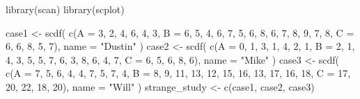 \documentclass[
  letterpaper,
  DIV=11,
  numbers=noendperiod]{scrreprt}
\newenvironment{Shaded}{\begin{snugshade}}{\end{snugshade}}
\newcommand{\AttributeTok}[1]{\textcolor[rgb]{0.40,0.45,0.13}{#1}}
\newcommand{\DecValTok}[1]{\textcolor[rgb]{0.68,0.00,0.00}{#1}}
\newcommand{\FunctionTok}[1]{\textcolor[rgb]{0.28,0.35,0.67}{#1}}
\newcommand{\NormalTok}[1]{\textcolor[rgb]{0.00,0.23,0.31}{#1}}
\newcommand{\OtherTok}[1]{\textcolor[rgb]{0.00,0.23,0.31}{#1}}
\newcommand{\StringTok}[1]{\textcolor[rgb]{0.13,0.47,0.30}{#1}}
\begin{document}
\begin{Shaded}
\begin{Highlighting}[]
\FunctionTok{library}\NormalTok{(scan)}
\FunctionTok{library}\NormalTok{(scplot)}

\NormalTok{case1 }\OtherTok{\textless{}{-}} \FunctionTok{scdf}\NormalTok{(}
  \FunctionTok{c}\NormalTok{(}\AttributeTok{A =} \DecValTok{3}\NormalTok{, }\DecValTok{2}\NormalTok{, }\DecValTok{4}\NormalTok{, }\DecValTok{6}\NormalTok{, }\DecValTok{4}\NormalTok{, }\DecValTok{3}\NormalTok{, }
    \AttributeTok{B =} \DecValTok{6}\NormalTok{, }\DecValTok{5}\NormalTok{, }\DecValTok{4}\NormalTok{, }\DecValTok{6}\NormalTok{, }\DecValTok{7}\NormalTok{, }\DecValTok{5}\NormalTok{, }\DecValTok{6}\NormalTok{, }\DecValTok{8}\NormalTok{, }\DecValTok{6}\NormalTok{, }\DecValTok{7}\NormalTok{, }\DecValTok{8}\NormalTok{, }\DecValTok{9}\NormalTok{, }\DecValTok{7}\NormalTok{, }\DecValTok{8}\NormalTok{, }
    \AttributeTok{C =} \DecValTok{6}\NormalTok{, }\DecValTok{6}\NormalTok{, }\DecValTok{8}\NormalTok{, }\DecValTok{5}\NormalTok{, }\DecValTok{7}\NormalTok{), }
  \AttributeTok{name =} \StringTok{"Dustin"}
\NormalTok{)}
\NormalTok{case2 }\OtherTok{\textless{}{-}} \FunctionTok{scdf}\NormalTok{(}
  \FunctionTok{c}\NormalTok{(}\AttributeTok{A =} \DecValTok{0}\NormalTok{, }\DecValTok{1}\NormalTok{, }\DecValTok{3}\NormalTok{, }\DecValTok{1}\NormalTok{, }\DecValTok{4}\NormalTok{, }\DecValTok{2}\NormalTok{, }\DecValTok{1}\NormalTok{, }
    \AttributeTok{B =} \DecValTok{2}\NormalTok{, }\DecValTok{1}\NormalTok{, }\DecValTok{4}\NormalTok{, }\DecValTok{3}\NormalTok{, }\DecValTok{5}\NormalTok{, }\DecValTok{5}\NormalTok{, }\DecValTok{7}\NormalTok{, }\DecValTok{6}\NormalTok{, }\DecValTok{3}\NormalTok{, }\DecValTok{8}\NormalTok{, }\DecValTok{6}\NormalTok{, }\DecValTok{4}\NormalTok{, }\DecValTok{7}\NormalTok{, }
    \AttributeTok{C =} \DecValTok{6}\NormalTok{, }\DecValTok{5}\NormalTok{, }\DecValTok{6}\NormalTok{, }\DecValTok{8}\NormalTok{, }\DecValTok{6}\NormalTok{), }
  \AttributeTok{name =} \StringTok{"Mike"}
\NormalTok{)}
\NormalTok{case3 }\OtherTok{\textless{}{-}} \FunctionTok{scdf}\NormalTok{(}
  \FunctionTok{c}\NormalTok{(}\AttributeTok{A =} \DecValTok{7}\NormalTok{, }\DecValTok{5}\NormalTok{, }\DecValTok{6}\NormalTok{, }\DecValTok{4}\NormalTok{, }\DecValTok{4}\NormalTok{, }\DecValTok{7}\NormalTok{, }\DecValTok{5}\NormalTok{, }\DecValTok{7}\NormalTok{, }\DecValTok{4}\NormalTok{,}
    \AttributeTok{B =} \DecValTok{8}\NormalTok{, }\DecValTok{9}\NormalTok{, }\DecValTok{11}\NormalTok{, }\DecValTok{13}\NormalTok{, }\DecValTok{12}\NormalTok{, }\DecValTok{15}\NormalTok{, }\DecValTok{16}\NormalTok{, }\DecValTok{13}\NormalTok{, }\DecValTok{17}\NormalTok{, }\DecValTok{16}\NormalTok{, }\DecValTok{18}\NormalTok{,}
    \AttributeTok{C =} \DecValTok{17}\NormalTok{, }\DecValTok{20}\NormalTok{, }\DecValTok{22}\NormalTok{, }\DecValTok{18}\NormalTok{, }\DecValTok{20}\NormalTok{), }
  \AttributeTok{name =} \StringTok{"Will"}
\NormalTok{)}
\NormalTok{strange\_study }\OtherTok{\textless{}{-}} \FunctionTok{c}\NormalTok{(case1, case2, case3)}
\end{Highlighting}
\end{Shaded}
\end{document}
